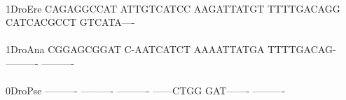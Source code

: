 \documentclass[11pt,twoside,reqno,a4paper]{article}
\begin{document}
{\hspace*{5\charwidth}\hspace*{7\charwidth}\hspace*{1\charwidth}\hspace*{1\charwidth}\hspace*{1\charwidth}\hspace*{1\charwidth}\hspace*{1\charwidth}\hspace*{1\charwidth}\\
1\hspace*{4\charwidth}DroEre	CAGAGGCCAT	ATTGTCATCC	AAGATTATGT	TTTTGACAGG	CATCACGCCT	GTCATA----	\\
\hspace*{5\charwidth}\hspace*{7\charwidth}\hspace*{1\charwidth}\hspace*{1\charwidth}\hspace*{1\charwidth}\hspace*{1\charwidth}\hspace*{1\charwidth}\hspace*{1\charwidth}\\
1\hspace*{4\charwidth}DroAna	CGGAGCGGAT	C-AATCATCT	AAAATTATGA	TTTTGACAG-	----------	----------	\\
\hspace*{5\charwidth}\hspace*{7\charwidth}\hspace*{1\charwidth}\hspace*{1\charwidth}\hspace*{1\charwidth}\hspace*{1\charwidth}\hspace*{1\charwidth}\hspace*{1\charwidth}\\
0\hspace*{4\charwidth}DroPse	----------	----------	----------	------CTGG	GAT-------	----------	\\
\hspace*{5\charwidth}\hspace*{7\charwidth}\hspace*{1\charwidth}\hspace*{1\charwidth}\hspace*{1\charwidth}\hspace*{1\charwidth}\hspace*{1\charwidth}\hspace*{1\charwidth}\\
}
\end{document}
